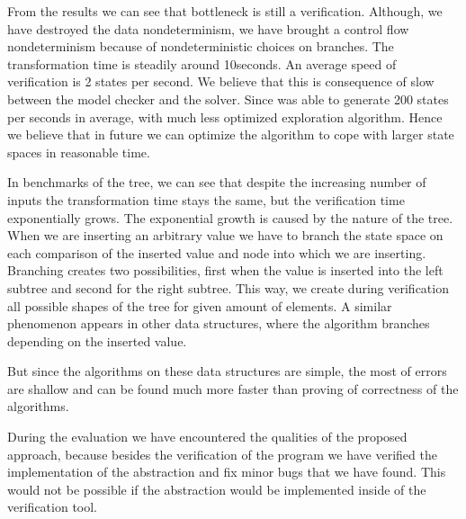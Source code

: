 From the results we can see that bottleneck is still a verification. Although,
we have destroyed the data nondeterminism, we have brought a control flow
nondeterminism because of nondeterministic choices on branches. The transformation
time is steadily around 10seconds. An average speed of verification is 2 states
per second. We believe that this is consequence of slow \API between the model
checker and the \SMT solver. Since \SymDIVINE was able to generate 200 states
per seconds in average, with much less optimized exploration algorithm. Hence we
believe that in future we can optimize the algorithm to cope with larger state
spaces in reasonable time.

In benchmarks of the \AVL tree, we can see that despite the increasing number of inputs
the transformation time stays the same, but the verification time exponentially
grows. The exponential growth is caused by the nature of the \AVL tree. When we
are inserting an arbitrary value we have to branch the state space on each
comparison of the inserted value and node into which we are inserting. Branching
creates two possibilities, first when the value is inserted into the left
subtree and second for the right subtree. This way, we create during
verification all possible shapes of the \AVL tree for given amount of elements.
A similar phenomenon appears in other data structures, where the algorithm branches
depending on the inserted value.

But since the algorithms on these data structures are simple, the most of errors
are shallow and can be found much more faster than proving of correctness of
the algorithms.

During the evaluation we have encountered the qualities of the proposed
approach, because besides the verification of the program we have verified the
implementation of the abstraction and fix minor bugs that we have found. This
would not be possible if the abstraction would be implemented inside of the
verification tool.
